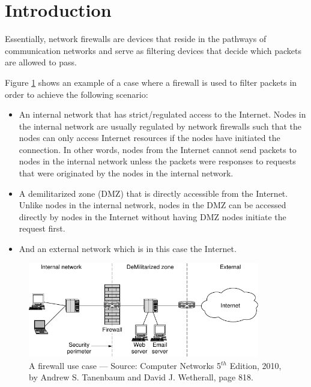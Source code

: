 \documentclass[pdftex,12pt,a4paper]{article}
\begin{document}
    \section{Introduction}
        Essentially, network firewalls are devices that reside in the pathways
        of communication networks and serve as filtering devices that decide
        which packets are allowed to pass.

        Figure \ref{fig:fw} shows an example of a case where a firewall is used
        to filter packets in order to achieve the following scenario:
        \begin{itemize}
            \item An internal network that has strict/regulated access
                to the Internet. Nodes in the internal network are usually
                regulated by network firewalls such that the nodes can only
                access Internet resources if the nodes have initiated the
                connection. In other words, nodes from the Internet cannot
                send packets to nodes in the internal network unless the
                packets were responses to requests that were originated by the
                nodes in the internal network.
            \item A demilitarized zone (DMZ) that is directly accessible
                from the Internet. Unlike nodes in the internal network, nodes
                in the DMZ can be accessed directly by nodes in the Internet
                without having DMZ nodes initiate the request first.
            \item And an external network which is in this case the Internet.
        \end{itemize}

        \begin{figure}[tbh]
            \centering
            \includegraphics[width=0.9\textwidth]{figures/firewall}
            \caption{A firewall use case --- Source: Computer Networks 5$^{th}$
            Edition, 2010, by Andrew S. Tanenbaum and David J. Wetherall, page
            818.}
            \label{fig:fw}
        \end{figure}
\end{document}
